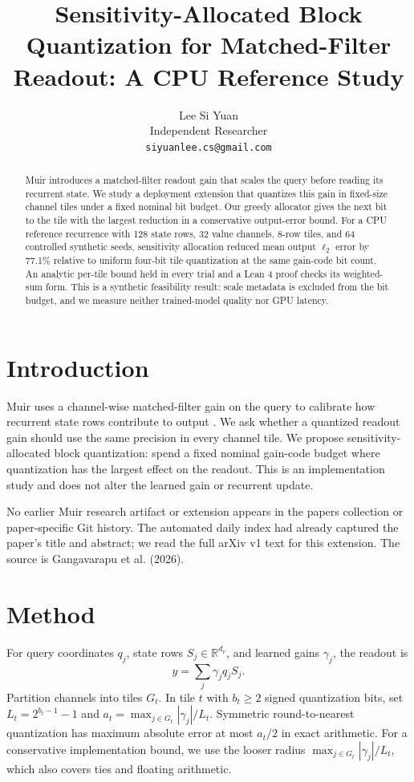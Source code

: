 \documentclass[11pt]{article}
\title{Sensitivity-Allocated Block Quantization for Matched-Filter Readout: A CPU Reference Study}
\author{Lee Si Yuan \\
  Independent Researcher \\
  \texttt{siyuanlee.cs@gmail.com}}
\begin{document}
\maketitle
\begin{abstract}
Muir introduces a matched-filter readout gain that scales the query before reading its recurrent state. We study a deployment extension that quantizes this gain in fixed-size channel tiles under a fixed nominal bit budget. Our greedy allocator gives the next bit to the tile with the largest reduction in a conservative output-error bound. For a CPU reference recurrence with 128 state rows, 32 value channels, 8-row tiles, and 64 controlled synthetic seeds, sensitivity allocation reduced mean output $\ell_2$ error by 77.1\% relative to uniform four-bit tile quantization at the same gain-code bit count. An analytic per-tile bound held in every trial and a Lean 4 proof checks its weighted-sum form. This is a synthetic feasibility result: scale metadata is excluded from the bit budget, and we measure neither trained-model quality nor GPU latency.
\end{abstract}
\section{Introduction}
Muir uses a channel-wise matched-filter gain on the query to calibrate how recurrent state rows contribute to output \citep{gangavarapu2026muir}. We ask whether a quantized readout gain should use the same precision in every channel tile. We propose sensitivity-allocated block quantization: spend a fixed nominal gain-code budget where quantization has the largest effect on the readout. This is an implementation study and does not alter the learned gain or recurrent update.

No earlier Muir research artifact or extension appears in the papers collection or paper-specific Git history. The automated daily index had already captured the paper's title and abstract; we read the full arXiv v1 text for this extension. The source is Gangavarapu et al. (2026).
\section{Method}
For query coordinates $q_j$, state rows $S_j\in\mathbb{R}^{d_v}$, and learned gains $\gamma_j$, the readout is
\begin{equation}
 y=\sum_j \gamma_j q_j S_j.
\end{equation}
Partition channels into tiles $G_t$. In tile $t$ with $b_t\ge2$ signed quantization bits, set $L_t=2^{b_t-1}-1$ and $a_t=\max_{j\in G_t}|\gamma_j|/L_t$. Symmetric round-to-nearest quantization has maximum absolute error at most $a_t/2$ in exact arithmetic. For a conservative implementation bound, we use the looser radius $\max_{j\in G_t}|\gamma_j|/L_t$, which also covers ties and floating arithmetic.
\end{document}
